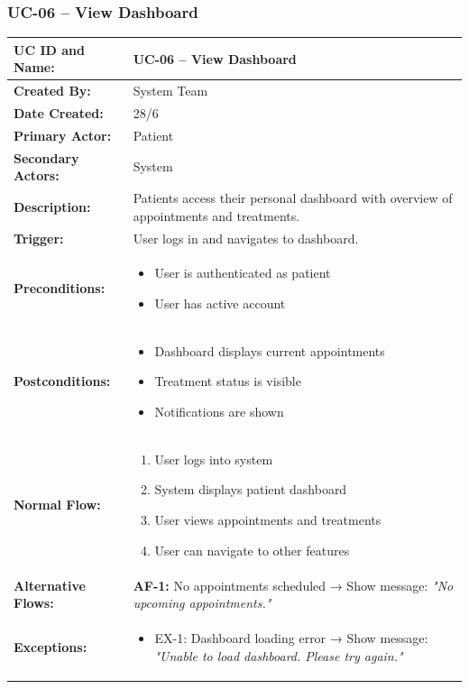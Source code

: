 \documentclass[12pt,a4paper]{article}
\begin{document}
\subsubsection{UC-06 – View Dashboard}

\renewcommand{\arraystretch}{1.5}
\begin{longtable}{|p{4.5cm}|p{10.5cm}|}
\hline
\textbf{UC ID and Name:} & UC-06 – View Dashboard \\
\hline
\textbf{Created By:} & System Team \\
\hline
\textbf{Date Created:} & 28/6 \\
\hline
\textbf{Primary Actor:} & Patient \\
\hline
\textbf{Secondary Actors:} & System \\
\hline
\textbf{Description:} & Patients access their personal dashboard with overview of appointments and treatments. \\
\hline
\textbf{Trigger:} & User logs in and navigates to dashboard. \\
\hline
\textbf{Preconditions:} &
\begin{itemize}
  \item User is authenticated as patient
  \item User has active account
\end{itemize} \\
\hline
\textbf{Postconditions:} &
\begin{itemize}
  \item Dashboard displays current appointments
  \item Treatment status is visible
  \item Notifications are shown
\end{itemize} \\
\hline
\textbf{Normal Flow:} &
\begin{enumerate}
  \item User logs into system
  \item System displays patient dashboard
  \item User views appointments and treatments
  \item User can navigate to other features
\end{enumerate} \\
\hline
\textbf{Alternative Flows:} &
\textbf{AF-1:} No appointments scheduled → Show message: \textit{"No upcoming appointments."} \\
\hline
\textbf{Exceptions:} &
\begin{itemize}
  \item EX-1: Dashboard loading error → Show message: \textit{"Unable to load dashboard. Please try again."}

\end{itemize}
\end{longtable}
\end{document}

